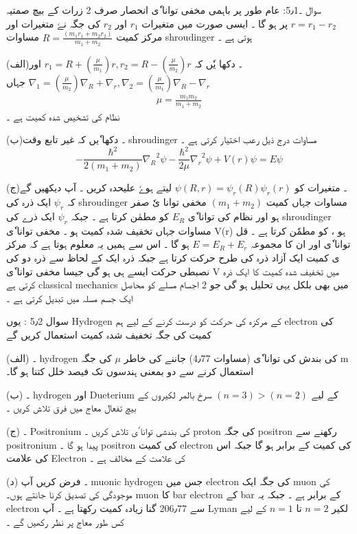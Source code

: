 سوال ۔5٫1:
عام طور پر  باہمی مخفی توانا ٗی انحصار صرف 2 زرات کے بیچ صمتیہ
$ r = r_1 - r_2 $
پر ہو گا ۔ ایسی صورت میں متغیرات 
$ r_1  $
اور 
$  r_2  $
کی جگہ نےٗ متغیرات  اور مرکز کمیت
$  R = \frac{ ( m_1 r_1 + m_2 r_2 ) }{ m_1 + m_2 } $
مساوات shroudinger ہوتی ہے ۔ 


(الف)۔  دکھا یٗں کہ 
$ r_1 = R + (\frac{ \mu}{m_1} )r , r_2 = R - (\frac{ \mu }{ m_2 } )r   $ 
اور 
$ \nabla_1 = ( \frac{ \mu }{ m_2 } )\nabla_R + \nabla_r , \nabla_2 = ( \frac{ \mu }{ m_1 } ) \nabla_R - \nabla_r $ 
جہاں 
\begin{align}
\mu = \frac{ m_1 m_2 }{ m_1 + m_2 }
\end{align}
نظام کی تشخیص شدہ کمیت ہے ۔
 
(ب)۔ دکھا ٗیں کہ غیر تابع وقت shroudinger  مساوات درج ذیل رعب اختیار کرتی ہے ۔
\[
- \frac{ \hbar^2 }{ 2 ( m_1 + m_2 ) } { \nabla_R }^2  \psi - \frac{ \hbar^2 }{ 2 \mu } { \nabla_r }^2 { \psi } + V(r) \psi = E \psi
\]

(ج)۔ متغیرات کو 
$ \psi ( R , r ) = { \psi_r }(R) { \psi_r } (r) $
لیتے ہوےٗ علیحدہ کریں ۔ آپ دیکھیں گے کہ 
$ \psi_r $
 ایک ذرہ کی shroudinger مساوات جہاں کمیت 
$ ( m_1 + m_2 ) $
مخفی توانا یٗ صفر ہو اور نظام کی توانا ٗی 
$ E_R $
کو مطمٰن کرتا ہے ۔ جبکہ 
$ \psi_r $
ایک ذرے کی shroudinger مساوات جہاں تخفیف شدہ کمیت ہو ۔  مخفی توانا ٗی  V(r) ہو ، کو مطمٗن کرتا ہے ۔ قل توانا ٗی اور ان کا مجموعہ 
$ E = E_R + E_r $
ہو گا ۔ اس سے ہمیں یہ معلوم ہوتا ہے  کہ مرکز ی کمیت ایک آزاد ذرہ کی طرح حرکت کرتا ہے جبکہ ذرہ ایک کے لحاظ سے ذرہ دو کی  نصبطی حرکت ایسے ہی ہو گی جیسا مخفی توانا ٗی V میں تخفیف شدہ کمیت کا ایک ذرہ  کرتی ہے classical mechanics میں بھی بلکل یہی تحلیل ہو گی    جو 2 اجسام مسلے کو محاصل ایک جسم مسلہ میں  تبدیل کرتی ہے ۔ 

\newpage 

سوال 5٫2 : یوں Hydrogen کے مرکزہ کی حرکت کو درست کرنے کے لیے ہم electron  کی کمیت کی جگہ تخفیف شدہ کمیت استعمال کریں گے 

(الف) ۔ hydrogen کی بندش کی توانا ٗی (مساوات 4٫77) جاننے کی خاطر 
$ \mu $
کی جگہ m استعمال کرنے سے  دو بمعنی ہندسوں تک فیصد خلل کتنا ہو گا۔  

(ب) ۔ hydrogen اور Dueterium کے لیے 
$ ( n=3 ) > ( n=2 ) $ 
 سرخ بالمر لکیروں کے بیچ تفعال معاج میں فرق تلاش کریں ۔ 

(ج) ۔ Positronium کی بندشی توانا ٗی تلاش کریں ۔ proton کی جگہ  positron رکھنے سے positronium پیدا ہو گا ۔ positron کی کمیت electron کی کمیت کے برابر ہو گا جبکہ اس کی علامت Electron کی علامت کے مخالف ہے ۔ 

(د) ۔ فرض کریں آپ muonic hydrogen  جس میں electron کی جگہ ایک muon کی موجودگی کی تصدیق کرنا جانتے ہوں۔ muon کا bar  electron کے bar  کے برابر ہے ۔ جبکہ یہ electron سے 206٫77 گنا زیادہ  کمیت رکھتا ہے ۔  آپ Lyman    لکیر  
$ n = 2 $
تا 
$ n = 1 $
کے لیے کس طور معاج پر نظر رکھیں گے ۔ 

